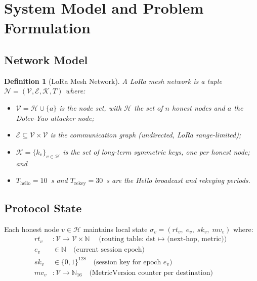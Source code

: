 \documentclass[preprint,12pt]{elsarticle}
\newtheorem{definition}{Definition}
\begin{document}
\section{System Model and Problem Formulation}
\label{sec:model}

\subsection{Network Model}

\begin{definition}[LoRa Mesh Network]
A LoRa mesh network is a tuple $\mathcal{N} = (\mathcal{V}, \mathcal{E}, \mathcal{K}, T)$
where:
\begin{itemize}
  \item $\mathcal{V} = \mathcal{H} \cup \{a\}$ is the node set,
    with $\mathcal{H}$ the set of $n$ honest nodes and $a$ the
    Dolev-Yao attacker node;
  \item $\mathcal{E} \subseteq \mathcal{V} \times \mathcal{V}$ is
    the communication graph (undirected, LoRa range-limited);
  \item $\mathcal{K} = \{k_v\}_{v \in \mathcal{H}}$ is the set of
    long-term symmetric keys, one per honest node; and
  \item $T_{\text{hello}} = 10$~s and $T_{\text{rekey}} = 30$~s
    are the Hello broadcast and rekeying periods.
\end{itemize}
\end{definition}

\subsection{Protocol State}

Each honest node $v \in \mathcal{H}$ maintains local state
$\sigma_v = (rt_v,\; e_v,\; sk_v,\; mv_v)$ where:
\begin{align}
  rt_v &: \mathcal{V} \to \mathcal{V} \times \mathbb{N}
          \quad\text{(routing table: dst $\mapsto$ (next-hop, metric))} \\
  e_v  &\in \mathbb{N}
          \quad\text{(current session epoch)} \\
  sk_v &\in \{0,1\}^{128}
          \quad\text{(session key for epoch $e_v$)} \\
  mv_v &: \mathcal{V} \to \mathbb{N}_{16}
          \quad\text{(MetricVersion counter per destination)}
\end{align}
\end{document}
